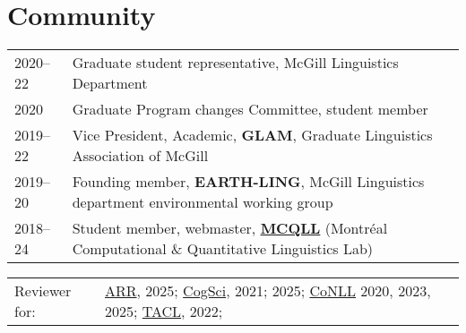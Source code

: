 \documentclass[11pt,a4paper]{article}
\begin{document}
  \section{Community}
  \begin{longtable}{p{1.7cm}|p{15cm}}
    \textsc{2020--22}
    &%
    Graduate student representative, McGill Linguistics Department\\
    \textsc{2020}
    &%
    Graduate Program changes Committee, student member\\
    \textsc{2019--22}
    &%
    Vice President, Academic, \textbf{GLAM}, Graduate Linguistics Association of
    McGill\\
    \textsc{2019--20}&%
    Founding member, \textbf{EARTH-LING}, McGill Linguistics department
    environmental working group\\
    \textsc{2018--24}
    &%
    Student member, webmaster, \href{http://mcqll.org}{\textbf{MCQLL}} (Montréal Computational \& Quantitative
    Linguistics Lab)\\
  \end{longtable}
  \begin{longtable}[l]{ll}
    Reviewer for:
    &%
    \href{https://aclrollingreview.org/}{ARR}, 2025;
    \href{https://cognitivesciencesociety.org/}{CogSci}, 2021; 2025;
    \href{https://www.conll.org/}{CoNLL} 2020, 2023, 2025;
    \href{https://transacl.org/}{TACL}, 2022;
  \end{longtable}

\end{document}
